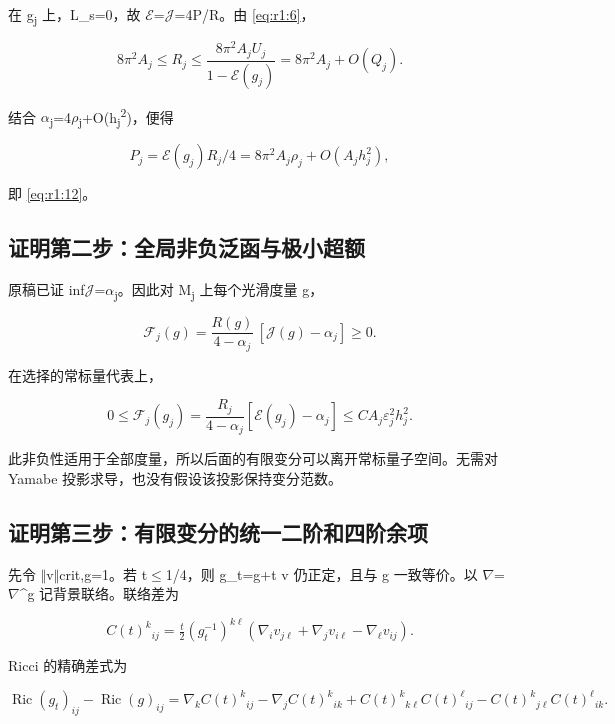 \documentclass[UTF8,11pt,fontset=none]{ctexart}
\begin{document}
在 g\textsubscript{j} 上，L\_s=0，故 \(\mathcal E\)=\(\mathcal J\)=4P/R。由 \eqref{eq:r1:6}，

\[
8\pi^2A_j\le R_j\le\frac{8\pi^2A_jU_j}{1-\mathcal E(g_j)}
=8\pi^2A_j+O(Q_j).
\]

结合 \(\alpha\)\textsubscript{j}=4\(\rho\)\textsubscript{j}+O(h\textsubscript{j}\textsuperscript{2})，便得

\[
P_j=\mathcal E(g_j)R_j/4
=8\pi^2A_j\rho_j+O(A_jh_j^2),
\]

即 \eqref{eq:r1:12}。

\subsection{证明第二步：全局非负泛函与极小超额}\label{ch1:ux8bc1ux660eux7b2cux4e8cux6b65ux5168ux5c40ux975eux8d1fux6cdbux51fdux4e0eux6781ux5c0fux8d85ux989d}

原稿已证 inf\(\mathcal J\)=\(\alpha\)\textsubscript{j}。因此对 M\textsubscript{j} 上每个光滑度量 g，

\[
\mathscr F_j(g)
=\frac{R(g)}{4-\alpha_j}\,[\mathcal J(g)-\alpha_j]\ge0.
\tag{1.13}\label{eq:r1:13}
\]

在选择的常标量代表上，

\[
0\le\mathscr F_j(g_j)
=\frac{R_j}{4-\alpha_j}[\mathcal E(g_j)-\alpha_j]
\le C A_j\varepsilon_j^2h_j^2.
\tag{1.14}\label{eq:r1:14}
\]

此非负性适用于全部度量，所以后面的有限变分可以离开常标量子空间。无需对 Yamabe 投影求导，也没有假设该投影保持变分范数。

\subsection{证明第三步：有限变分的统一二阶和四阶余项}\label{ch1:ux8bc1ux660eux7b2cux4e09ux6b65ux6709ux9650ux53d8ux5206ux7684ux7edfux4e00ux4e8cux9636ux548cux56dbux9636ux4f59ux9879}

先令 \(\Vert\)v\(\Vert\)crit,g=1。若 \textbar t\textbar\(\le\)1/4，则 g\_t=g+t v 仍正定，且与 g 一致等价。以 \(\nabla\)=\(\nabla\)\^{}g 记背景联络。联络差为

\[
C(t)^k{}_{ij}
=\tfrac t2(g_t^{-1})^{k\ell}
(\nabla_i v_{j\ell}+\nabla_j v_{i\ell}-\nabla_\ell v_{ij}).
\tag{1.15}\label{eq:r1:15}
\]

Ricci 的精确差式为

\[
\operatorname{Ric}(g_t)_{ij}-\operatorname{Ric}(g)_{ij}
=\nabla_kC(t)^k{}_{ij}-\nabla_jC(t)^k{}_{ik}
+C(t)^k{}_{k\ell}C(t)^\ell{}_{ij}
-C(t)^k{}_{j\ell}C(t)^\ell{}_{ik}.
\tag{1.16}\label{eq:r1:16}
\]
\end{document}
